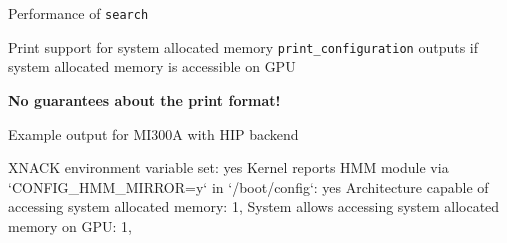 \begin{frame}[fragile]{Performance of \texttt{search}}

  \begin{center}

  \end{center}

\end{frame}
\begin{frame}[fragile]{Print support for system allocated memory}
  \texttt{print\_configuration} outputs if system allocated memory is accessible on GPU
  \begin{center}
    \textbf{No guarantees about the print format!}
  \end{center}

  \vspace{5pt}

  \begin{center}
    Example output for MI300A with HIP backend
  \end{center}
  \begin{code}
    XNACK environment variable set: yes
    Kernel reports HMM module via `CONFIG_HMM_MIRROR=y` in `/boot/config`: yes
    Architecture capable of accessing system allocated memory: 1,
    System allows accessing system allocated memory on GPU: 1,
  \end{code}
    
\end{frame}
